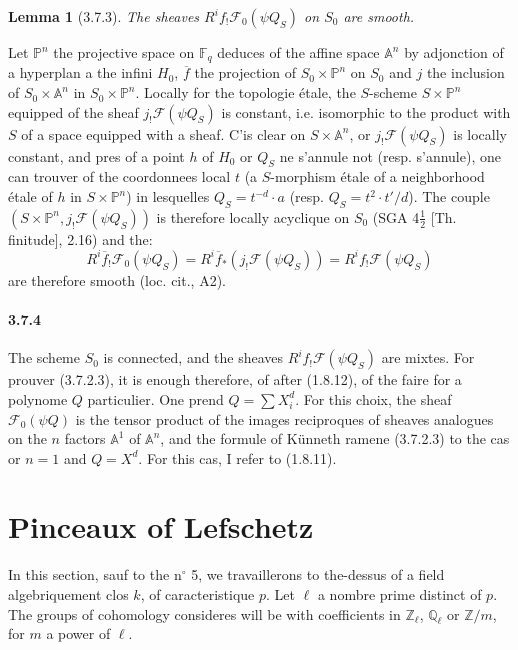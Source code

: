 \documentclass[12pt,a4paper]{article}
\theoremstyle{plain}
\newtheorem{lemma}[theorem]{Lemma}
\theoremstyle{definition}
\theoremstyle{remark}
\newcommand{\FF}{{\mathbb{F}}}
\newcommand{\QQ}{{\mathbb{Q}}}
\newcommand{\ZZ}{{\mathbb{Z}}}
\newcommand{\PP}{{\mathbb{P}}}
\renewcommand{\AA}{\ensuremath{\mathbb{A}}}
\begin{document}
\begin{lemma}[3.7.3]
The sheaves $R^i f_! \mathscr{F}_0(\psi Q_S)$ on $S_0$ are smooth.
\end{lemma}

Let $\PP^n$ the projective space on $\FF_q$ deduces of the affine space $\AA^n$ by adjonction of a hyperplan a the infini $H_0$, $\overline{f}$ the projection of $S_0 \times \PP^n$ on $S_0$ and $j$ the inclusion of $S_0 \times \AA^n$ in $S_0 \times \PP^n$. Locally for the topologie étale, the $S$-scheme $S \times \PP^n$ equipped of the sheaf $j_! \mathscr{F}(\psi Q_S)$ is constant, i.e. isomorphic to the product with $S$ of a space equipped with a sheaf. C'is clear on $S \times \AA^n$, or $j_! \mathscr{F}(\psi Q_S)$ is locally constant, and pres of a point $h$ of $H_0$ or $Q_S$ ne s'annule not (resp. s'annule), one can trouver of the coordonnees local $t$ (a $S$-morphism étale of a neighborhood étale of $h$ in $S \times \PP^n$) in lesquelles $Q_S = t^{-d} \cdot a$ (resp. $Q_S = t^2 \cdot t'/d$). The couple $(S \times \PP^n, j_! \mathscr{F}(\psi Q_S))$ is therefore locally acyclique on $S_0$ (SGA 4$\frac{1}{2}$ [Th. finitude], 2.16) and the:
\[ R^i \overline{f}_! \mathscr{F}_0(\psi Q_S) = R^i \overline{f}_* (j_! \mathscr{F}(\psi Q_S)) = R^i f_! \mathscr{F}(\psi Q_S) \]
are therefore smooth (loc. cit., A2).

\paragraph{3.7.4}
The scheme $S_0$ is connected, and the sheaves $R^i f_! \mathscr{F}(\psi Q_S)$ are mixtes. For prouver (3.7.2.3), it is enough therefore, of after (1.8.12), of the faire for a polynome $Q$ particulier. One prend $Q = \sum X_i^d$. For this choix, the sheaf $\mathscr{F}_0(\psi Q)$ is the tensor product of the images reciproques of sheaves analogues on the $n$ factors $\AA^1$ of $\AA^n$, and the formule of K\"unneth ramene (3.7.2.3) to the cas or $n = 1$ and $Q = X^d$. For this cas, I refer to (1.8.11).


\newpage
\section{Pinceaux of Lefschetz}

In this section, sauf to the n$^\circ$ 5, we travaillerons to the-dessus of a field algebriquement clos $k$, of caracteristique $p$. Let $\ell$ a nombre prime distinct of $p$. The groups of cohomology consideres will be with coefficients in $\ZZ_\ell$, $\QQ_\ell$ or $\ZZ/m$, for $m$ a power of $\ell$.
\end{document}
